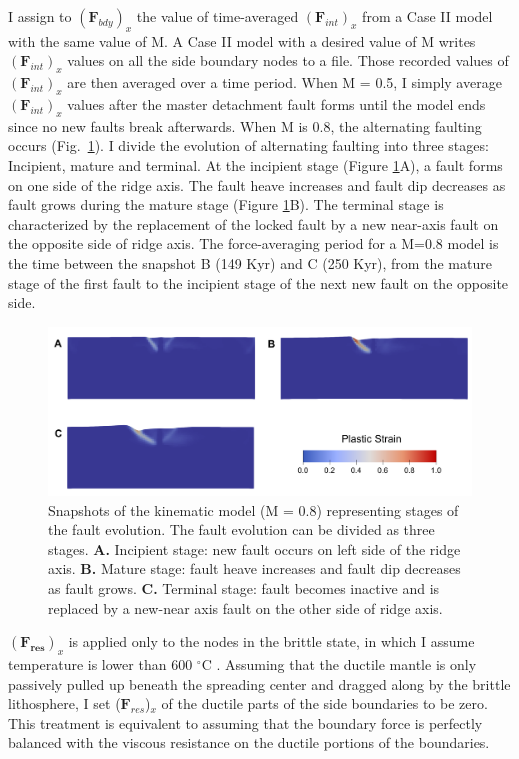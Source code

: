 \documentclass[letterpaper,12pt,notitle]{memphisthesis}                     %
\begin{document}
I assign to $(\boldsymbol{F}_{bdy})_x$ the value of time-averaged $(\boldsymbol{F}_{int})_x$ %
from a Case II model with the same value of M. A Case II model with a desired value of M writes $(\boldsymbol{F}_{int})_x$ values on all the side boundary nodes to a file. Those recorded values of $(\boldsymbol{F}_{int})_{x}$ are then averaged over a time period. When M = 0.5, I simply average $(\boldsymbol{F}_{int})_{x}$ values after the master detachment fault forms until the model ends since no new faults break afterwards.
When M is 0.8, the alternating faulting occurs (Fig.~\ref{fig:faultstage}). I divide the evolution of alternating faulting into three stages: Incipient, mature and terminal. At the incipient stage (Figure \ref{fig:faultstage}A), a fault forms on one side of the ridge axis. The fault heave increases and fault dip decreases as fault grows during the mature stage (Figure \ref{fig:faultstage}B). The terminal stage is characterized by the replacement of the locked fault by a new near-axis fault on the opposite side of ridge axis. The force-averaging period for a M=0.8 model is the time between the snapshot B (149 Kyr) and C (250 Kyr), from the mature stage of the first fault to the incipient stage of the next new fault on the opposite side. 
%
\begin{figure}[!htb]
	\centering
	\includegraphics[width=0.9\linewidth]{./figs/fault_stage.pdf}
	\caption{Snapshots of the kinematic model (M = 0.8) representing stages of the fault evolution. The fault evolution can be divided as three stages. \textbf{A.} Incipient stage: new fault occurs on left side of the ridge axis. \textbf{B.} Mature stage: fault heave increases and fault dip decreases as fault grows. \textbf{C.} Terminal stage: fault becomes inactive and is replaced by a new-near axis fault on the other side of ridge axis.}
	\label{fig:faultstage}
\end{figure}

$(\boldsymbol{F_{res}})_x$ is applied only to the nodes in the brittle state, in which I assume temperature is lower than 600 $^\circ$C \citep[e.g.,][]{Violay2012}. Assuming that the ductile mantle is only passively pulled up beneath the spreading center and dragged along by the brittle lithosphere, I set ($\boldsymbol{F}_{res}$)$_x$ of the ductile parts of the side boundaries to be zero. This treatment is equivalent to assuming that the boundary force is perfectly balanced with the viscous resistance on the ductile portions of the boundaries. %
\end{document}
